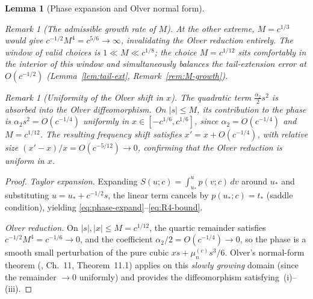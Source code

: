 \documentclass[12pt,a4paper]{amsart}
\newtheorem{lemma}[theorem]{Lemma}
\theoremstyle{definition}
\theoremstyle{remark}
\newtheorem{remark}[theorem]{Remark}
\newcommand{\ustar}{u_*}
\newcommand{\tstar}{t_*}
\begin{document}
\begin{lemma}[Phase expansion and Olver normal form]
\begin{remark}[The admissible growth rate of $M$]
At the other extreme, $M = c^{1/3}$ would give
$c^{-1/2}M^4 = c^{5/6} \to \infty$,
invalidating the Olver reduction entirely.
The window of valid choices is
$1 \ll M \ll c^{1/8}$;
the choice $M = c^{1/12}$ sits comfortably
in the interior of this window and
simultaneously balances the tail-extension
error at $O(c^{-1/2})$
(Lemma~\ref{lem:tail-ext}, Remark~\ref{rem:M-growth}).
\end{remark}

\begin{remark}[Uniformity of the Olver shift in $x$]
\label{rem:olver-uniform}
The quadratic term $\tfrac{\alpha_2}{2}s^2$ is absorbed
into the Olver diffeomorphism. On $|s| \le M$,
its contribution to the phase is
$\alpha_2 s^2 = O(c^{-1/4})$ uniformly in
$x \in [-c^{1/6}, c^{1/6}]$,
since $\alpha_2 = O(c^{-1/4})$ and $M = c^{1/12}$.
The resulting frequency shift satisfies
$x' = x + O(c^{-1/4})$, with relative size
$(x'-x)/x = O(c^{-5/12}) \to 0$,
confirming that the Olver reduction is uniform in $x$.
\end{remark}
\end{lemma}

\begin{proof}
\textit{Taylor expansion.}
Expanding $S(u;c) = \int_{\ustar}^u p(v;c)\,dv$
around $\ustar$ and substituting
$u = \ustar + c^{-1/2}s$,
the linear term cancels by
$p(\ustar;c) = \tstar$ (saddle condition),
yielding \eqref{eq:phase-expand}--\eqref{eq:R4-bound}.

\textit{Olver reduction.}
On $|s|, |x| \le M = c^{1/12}$,
the quartic remainder satisfies
$c^{-1/2}M^4 = c^{-1/6} \to 0$,
and the coefficient $\alpha_2/2 = O(c^{-1/4}) \to 0$,
so the phase is a smooth small perturbation
of the pure cubic $xs + \mu_n^{(c)}s^3/6$.
Olver's normal-form theorem
(\cite{Olver1974}, Ch.~11, Theorem~11.1)
applies on this \emph{slowly growing} domain
(since the remainder $\to 0$ uniformly)
and provides the diffeomorphism satisfying~(i)--(iii).
\end{proof}
\end{document}
